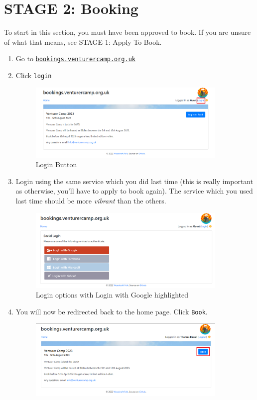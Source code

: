 \chapter{STAGE 2: Booking}
To start in this section, you must have been approved to book. If you are unsure of what that means, see STAGE 1: Apply To Book.
\begin{enumerate}
    \item Go to \href{https://bookings.venturercamp.org.uk}{\texttt{bookings.venturercamp.org.uk}}
    \item Click \verb|login|
    \begin{figure}[H]
        \centering
        \includegraphics[width=0.9\textwidth]{assets/login.png}
        \caption{Login Button}
    \end{figure}
    \item Login using the same service which you did last time (this is really important as otherwise, you'll have to apply to book again). The service which you used last time should be more \emph{vibrant} than the others.
    \begin{figure}[H]
        \centering
        \includegraphics[width=0.9\textwidth]{assets/login-using-vibrant.png}
        \caption{Login options with Login with Google highlighted}
    \end{figure}
    \item You will now be redirected back to the home page. Click \verb|Book|.
    \begin{figure}[H]
        \centering
        \includegraphics[width=0.9\textwidth]{assets/book.png}

\end{figure}
\end{enumerate}
